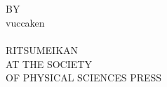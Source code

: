 \documentclass[uplatex,dvipdfmx]{vkaishi}
\begin{document}
\cleardoublepage
\thispagestyle{empty}

\begin{center} \ttfamily %
  {\fontsize{50}{0}\selectfont \rmfamily \vTitleRoma}\\[3zw]
  {\fontsize{40}{0}\selectfont \rmfamily \vNumberingRoma}\\
  \vfill
  {\fontsize{16}{0}\selectfont BY}\\[0.5zw]
  {\fontsize{18}{0}\selectfont vuccaken}\\[8zw]
  {\fontsize{15}{0}\selectfont \vDate}\\[8zw]
  {\fontsize{15}{0}\selectfont RITSUMEIKAN}\\[4zw]
  {\fontsize{15}{0}\selectfont AT THE SOCIETY}\\[0.5zw]
  {\fontsize{15}{0}\selectfont OF PHYSICAL SCIENCES PRESS}
\end{center}
\end{document}
